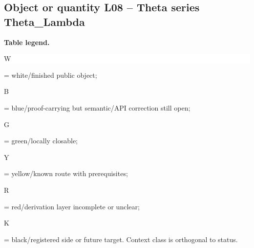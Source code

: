 \subsection*{Object or quantity L08 -- Theta series Theta\_Lambda}
\hypertarget{objproof:L08}{}
\par\smallskip\noindent\begin{minipage}{0.99\linewidth}\footnotesize\raggedright\textbf{Table legend.} \colorbox{white}{\strut W} = white/finished public object; \colorbox{cyan!20}{\strut B} = blue/proof-carrying but semantic/API correction still open; \colorbox{green!18}{\strut G} = green/locally closable; \colorbox{yellow!25}{\strut Y} = yellow/known route with prerequisites; \colorbox{red!20}{\strut R} = red/derivation layer incomplete or unclear; \colorbox{black!18}{\strut K} = black/registered side or future target. Context class is orthogonal to status.\end{minipage}\par\vspace{0.25em}
